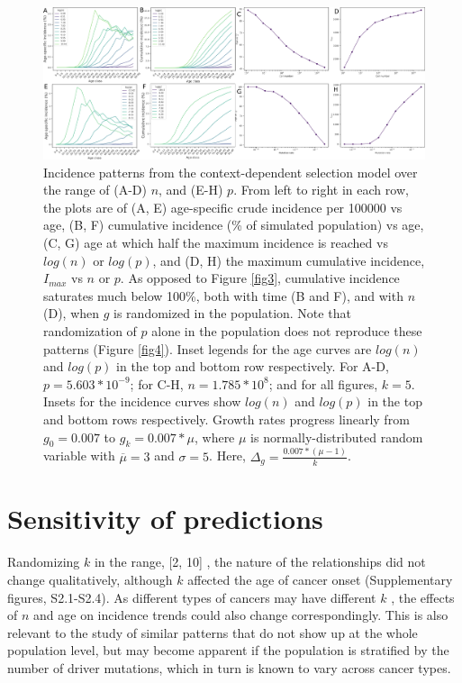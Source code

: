 \documentclass[9pt,twocolumn,twoside]{pnas-new}
\begin{document}
\begin{figure}[!h]
	\centering
	\includegraphics[width=\linewidth, keepaspectratio=true]{fig5.png}
	\caption{Incidence patterns from the context-dependent selection model over the range of (A-D) $n$, and (E-H) $p$. From left to right in each row, the plots are of (A, E) age-specific crude incidence per 100000 vs age, (B, F) cumulative incidence (\% of simulated population) vs age, (C, G) age at which half the maximum incidence is reached vs $log(n)$ or $log(p)$, and (D, H) the maximum cumulative incidence, $I_{max}$ vs $n$ or $p$. As opposed to Figure \ref{fig3}, cumulative incidence saturates much below 100\%, both with time (B and F), and with $n$ (D), when $g$ is randomized in the population. Note that randomization of $p$ alone in the population does not reproduce these patterns (Figure \ref{fig4}). Inset legends for the age curves are $log(n)$ and $log(p)$ in the top and bottom row respectively. For A-D, $p=5.603*10^{-9}$; for C-H, $n=1.785*10^{8}$; and for all figures, $k=5$. Insets for the incidence curves show $log(n)$ and $log(p)$ in the top and bottom rows respectively. Growth rates progress linearly from $g_{0}=0.007$ to $g_{k}=0.007*\mu$, where $\mu$ is normally-distributed random variable with $\overline{\mu}=3$ and $\sigma=5$. Here, $\Delta_{g}=\frac{0.007*(\mu-1)}{k}$.}
	\label{fig5}
\end{figure}


\section{Sensitivity of predictions}

Randomizing $k$ in the range, [2, 10] \cite{Martincorena2017}, the nature of the relationships did not change qualitatively, although $k$ affected the age of cancer onset (Supplementary figures, S2.1-S2.4). As different types of cancers may have different $k$ \cite{Nunney2015}, the effects of $n$ and age on incidence trends could also change correspondingly. This is also relevant to the study of similar patterns that do not show up at the whole population level, but may become apparent if the population is stratified by the number of driver mutations, which in turn is known to vary across cancer types.
\end{document}
